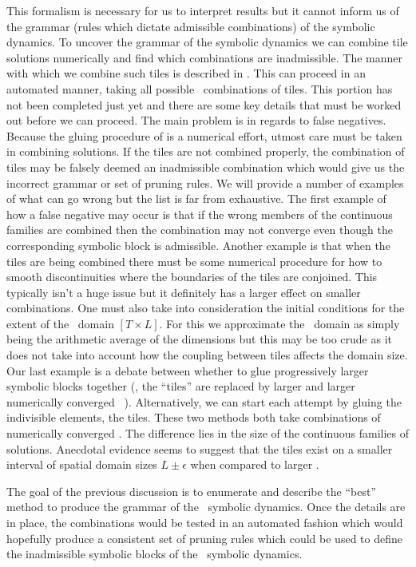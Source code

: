 This formalism is necessary for us to interpret results but
it cannot inform us of the grammar (rules which dictate admissible combinations)
of the symbolic dynamics. To uncover the grammar of the
symbolic dynamics we can combine tile solutions numerically
and find which combinations are inadmissible. The manner
with which we combine such tiles is described in .
This can proceed in an automated manner, taking all possible
\spt\ combinations of tiles. This portion has not been
completed just yet and there are some key details
that must be worked out before we can proceed.
The main problem is in regards to false negatives. Because
the gluing procedure of  is a numerical
effort, utmost care must be taken in combining solutions.
If the tiles are not combined properly, the combination
of tiles may be falsely deemed an inadmissible combination
which would give us the incorrect grammar or set
of pruning rules. We will provide a number
of examples of what can go wrong but the list
is far from exhaustive. The first example of how a false negative may
occur is that if the wrong members of the continuous families
are combined then the combination may not converge even
though the corresponding symbolic block is admissible.
Another example is that when the tiles are being combined
there must be some numerical procedure for how to smooth
discontinuities where the boundaries of the tiles are conjoined.
This typically isn't a huge issue but it definitely has a larger effect
on smaller combinations. One must also take into consideration
the initial conditions for the extent of the \spt\ domain $[T\!\times\!L]$.
For this we approximate the \spt\ domain as simply being the
arithmetic average of the dimensions but this may be too crude
as it does not take into account how the coupling between tiles
affects the domain size. Our last example
is a debate between whether to
glue progressively larger symbolic blocks together (\ie, the ``tiles''
are replaced by larger and larger numerically converged \twots\ ).
Alternatively, we can start each attempt by gluing the
indivisible elements, the tiles. These two methods both
take combinations of numerically converged \twots. The
difference lies in the size of the continuous families of solutions.
Anecdotal evidence seems to suggest that
the tiles exist on a smaller interval of spatial
domain sizes $L \pm \epsilon$ when compared to
larger \twots.

The goal of the previous discussion is to enumerate
and describe the ``best'' method to produce the grammar
of the \spt\ symbolic dynamics. Once the details are
in place, the combinations would be tested in an automated
fashion which would hopefully produce a consistent
set of pruning rules which could be used to define
the inadmissible symbolic blocks of the \spt\
symbolic dynamics.

